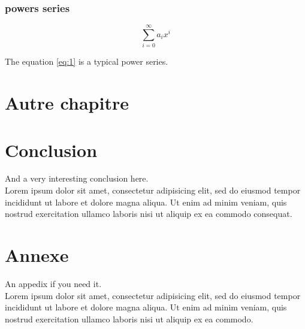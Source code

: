 \documentclass[a4paper, oneside, frenchb]{report}
\begin{document}
\subsection{powers series} \label{subsection}

\begin{equation} \label{eq:1}
\sum_{i=0}^{\infty} a_i x^i
\end{equation}

The equation \ref{eq:1} is a typical power series.

\chapter*{Autre chapitre}
\label{chapter2}
%
%

\chapter*{Conclusion}
\label{chap:conclusion}
%
  And a very interesting conclusion here\@. ~\\
  Lorem ipsum dolor sit amet, consectetur adipisicing elit, sed do eiusmod
  tempor incididunt ut labore et dolore magna aliqua. Ut enim ad minim veniam,
  quis nostrud exercitation ullamco laboris nisi ut aliquip ex ea commodo
  consequat.

\chapter*{Annexe}
\label{chap:appendix}

  An appedix if you need it. ~\\

  Lorem ipsum dolor sit amet, consectetur adipisicing elit, sed do eiusmod
  tempor incididunt ut labore et dolore magna aliqua. Ut enim ad minim veniam,
  quis nostrud exercitation ullamco laboris nisi ut aliquip ex ea commodo.


\nocite{*}


\end{document}
